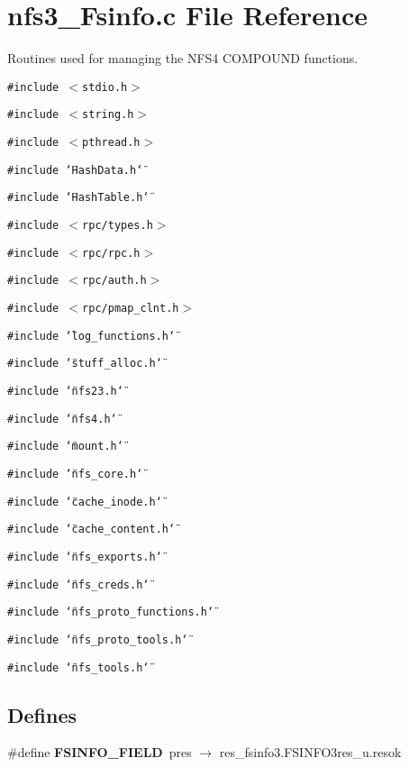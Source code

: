 \section{nfs3\_\-Fsinfo.c File Reference}
\label{nfs3__Fsinfo_8c}
Routines used for managing the NFS4 COMPOUND functions. 

{\tt \#include $<$stdio.h$>$}\par
{\tt \#include $<$string.h$>$}\par
{\tt \#include $<$pthread.h$>$}\par
{\tt \#include \char`\"{}Hash\-Data.h\char`\"{}}\par
{\tt \#include \char`\"{}Hash\-Table.h\char`\"{}}\par
{\tt \#include $<$rpc/types.h$>$}\par
{\tt \#include $<$rpc/rpc.h$>$}\par
{\tt \#include $<$rpc/auth.h$>$}\par
{\tt \#include $<$rpc/pmap\_\-clnt.h$>$}\par
{\tt \#include \char`\"{}log\_\-functions.h\char`\"{}}\par
{\tt \#include \char`\"{}stuff\_\-alloc.h\char`\"{}}\par
{\tt \#include \char`\"{}nfs23.h\char`\"{}}\par
{\tt \#include \char`\"{}nfs4.h\char`\"{}}\par
{\tt \#include \char`\"{}mount.h\char`\"{}}\par
{\tt \#include \char`\"{}nfs\_\-core.h\char`\"{}}\par
{\tt \#include \char`\"{}cache\_\-inode.h\char`\"{}}\par
{\tt \#include \char`\"{}cache\_\-content.h\char`\"{}}\par
{\tt \#include \char`\"{}nfs\_\-exports.h\char`\"{}}\par
{\tt \#include \char`\"{}nfs\_\-creds.h\char`\"{}}\par
{\tt \#include \char`\"{}nfs\_\-proto\_\-functions.h\char`\"{}}\par
{\tt \#include \char`\"{}nfs\_\-proto\_\-tools.h\char`\"{}}\par
{\tt \#include \char`\"{}nfs\_\-tools.h\char`\"{}}\par
\subsection*{Defines}
\begin{CompactItemize}
\item 
\#define {\bf FSINFO\_\-FIELD}\ pres $\rightarrow$ res\_\-fsinfo3.FSINFO3res\_\-u.resok
\end{CompactItemize}
